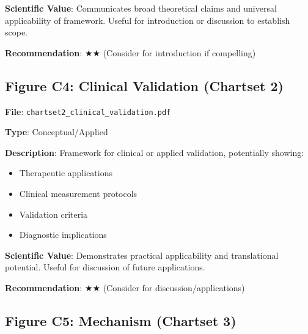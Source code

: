 \documentclass[11pt]{article}
\begin{document}
\textbf{Scientific Value}:
Communicates broad theoretical claims and universal applicability of framework. Useful for introduction or discussion to establish scope.

\textbf{Recommendation}: $\bigstar\bigstar$ (Consider for introduction if compelling)

\subsection{Figure C4: Clinical Validation (Chartset 2)}


\textbf{File}: \texttt{chartset2\_clinical\_validation.pdf}

\textbf{Type}: Conceptual/Applied

\textbf{Description}:
Framework for clinical or applied validation, potentially showing:
\begin{itemize}
\item Therapeutic applications
\item Clinical measurement protocols
\item Validation criteria
\item Diagnostic implications
\end{itemize}

\textbf{Scientific Value}:
Demonstrates practical applicability and translational potential. Useful for discussion of future applications.

\textbf{Recommendation}: $\bigstar\bigstar$ (Consider for discussion/applications)

\subsection{Figure C5: Mechanism (Chartset 3)}

\end{document}
